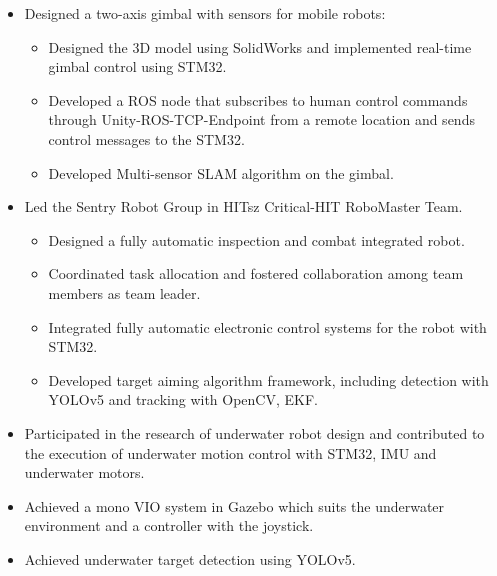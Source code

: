 \documentclass[11pt,a4paper]{moderncv}        %
\begin{document}
%
{
\begin{itemize}%
\item Designed a two-axis gimbal with sensors for mobile robots:
\begin{itemize}%
\item Designed the 3D model using SolidWorks and implemented real-time gimbal control using STM32.
\item Developed a ROS node that subscribes to human control commands through Unity-ROS-TCP-Endpoint from a remote location and sends control messages to the STM32.
\item Developed Multi-sensor SLAM algorithm on the gimbal.  
\end{itemize}
\end{itemize}
}

%
{
\begin{itemize}%
\item Led the Sentry Robot Group in HITsz Critical-HIT RoboMaster Team.
\begin{itemize}
\item Designed a fully automatic inspection and combat integrated robot.
\item Coordinated task allocation and fostered collaboration among team members as team leader.
\item Integrated fully automatic electronic control systems for the robot with STM32. 
\item Developed target aiming algorithm framework, including detection with YOLOv5 and tracking with OpenCV, EKF.
\end{itemize}
\end{itemize}
}

%
{
\begin{itemize}%
    \item Participated in the research of underwater robot design and contributed to the execution of underwater motion control with STM32, IMU and underwater motors.
    \item Achieved a mono VIO system in Gazebo which suits the underwater environment and a controller with the joystick.
    \item Achieved underwater target detection using YOLOv5.
\end{itemize}
}
\end{document}
